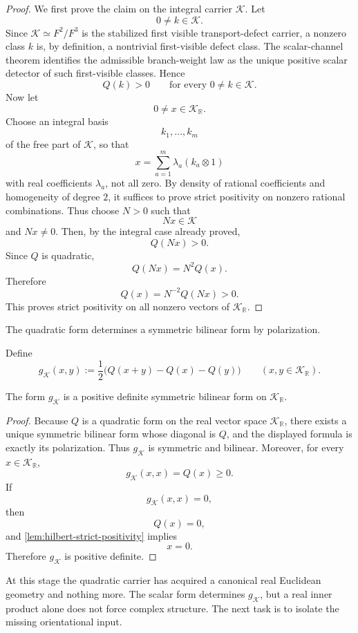 \begin{proof}
	We first prove the claim on the integral carrier \(\mathcal K\).
	Let
	\[
		0\neq k\in \mathcal K.
	\]
	Since \(\mathcal K\simeq F^{2}/F^{3}\) is the stabilized first visible
	transport-defect carrier, a nonzero class \(k\) is, by definition, a
	nontrivial first-visible defect class.
	The scalar-channel theorem identifies the admissible branch-weight law
	as the unique positive scalar detector of such first-visible classes.
	Hence
	\[
		Q(k)>0
		\qquad
		\text{for every }0\neq k\in\mathcal K.
	\]
	Now let
	\[
		0\neq x\in \mathcal K_{\mathbb R}.
	\]
	Choose an integral basis
	\[
		k_1,\dots,k_m
	\]
	of the free part of \(\mathcal K\), so that
	\[
		x=\sum_{a=1}^{m} \lambda_a (k_a\otimes 1)
	\]
	with real coefficients \(\lambda_a\), not all zero.
	By density of rational coefficients and homogeneity of degree \(2\), it
	suffices to prove strict positivity on nonzero rational combinations.
	Thus choose \(N>0\) such that
	\[
		Nx\in \mathcal K
	\]
	and \(Nx\neq 0\).
	Then, by the integral case already proved,
	\[
		Q(Nx)>0.
	\]
	Since \(Q\) is quadratic,
	\[
		Q(Nx)=N^{2}Q(x).
	\]
	Therefore
	\[
		Q(x)=N^{-2}Q(Nx)>0.
	\]
	This proves strict positivity on all nonzero vectors of
	\(\mathcal K_{\mathbb R}\).
\end{proof}
The quadratic form determines a symmetric bilinear form by polarization.
\begin{definition}
	Define
	\[
		g_{\mathcal K}(x,y)
		:=
		\frac12\bigl(Q(x+y)-Q(x)-Q(y)\bigr)
		\qquad
		(x,y\in\mathcal K_{\mathbb R}).
	\]
\end{definition}
\begin{proposition}
	\label{prop:hilbert-real-inner}
	The form \(g_{\mathcal K}\) is a positive definite symmetric bilinear
	form on \(\mathcal K_{\mathbb R}\).
\end{proposition}
\begin{proof}
	Because \(Q\) is a quadratic form on the real vector space
	\(\mathcal K_{\mathbb R}\), there exists a unique symmetric bilinear
	form whose diagonal is \(Q\), and the displayed formula is exactly its
	polarization.
	Thus \(g_{\mathcal K}\) is symmetric and bilinear.
	Moreover, for every \(x\in\mathcal K_{\mathbb R}\),
	\[
		g_{\mathcal K}(x,x)=Q(x)\ge 0.
	\]
	If
	\[
		g_{\mathcal K}(x,x)=0,
	\]
	then
	\[
		Q(x)=0,
	\]
	and \cref{lem:hilbert-strict-positivity} implies
	\[
		x=0.
	\]
	Therefore \(g_{\mathcal K}\) is positive definite.
\end{proof}
\begin{remark}
	At this stage the quadratic carrier has acquired a canonical real
	Euclidean geometry and nothing more.
	The scalar form determines \(g_{\mathcal K}\), but a real inner product
	alone does not force complex structure.
	The next task is to isolate the missing orientational input.
\end{remark}
